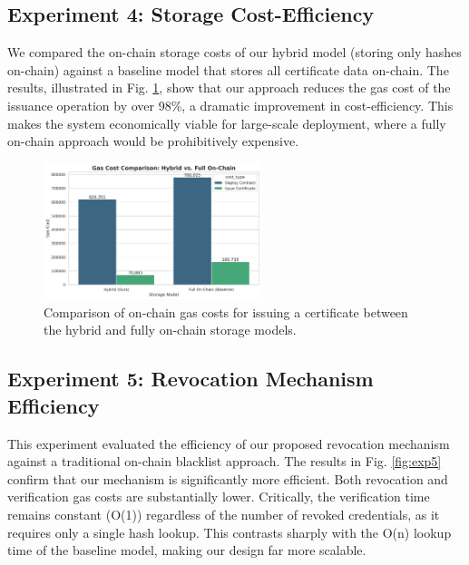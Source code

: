 \documentclass[lettersize,journal]{IEEEtran}
\begin{document}
\begin{itemize}
\subsection{Experiment 4: Storage Cost-Efficiency}
We compared the on-chain storage costs of our hybrid model (storing only hashes on-chain) against a baseline model that stores all certificate data on-chain. The results, illustrated in Fig. \ref{fig:exp4}, show that our approach reduces the gas cost of the issuance operation by over 98\%, a dramatic improvement in cost-efficiency. This makes the system economically viable for large-scale deployment, where a fully on-chain approach would be prohibitively expensive.

\begin{figure}[!t]
\centering
\includegraphics[width=2.5in]{figures/fig4_storage_cost.png}
\caption{Comparison of on-chain gas costs for issuing a certificate between the hybrid and fully on-chain storage models.}
\label{fig:exp4}
\end{figure}

\subsection{Experiment 5: Revocation Mechanism Efficiency}
This experiment evaluated the efficiency of our proposed revocation mechanism against a traditional on-chain blacklist approach. The results in Fig. \ref{fig:exp5} confirm that our mechanism is significantly more efficient. Both revocation and verification gas costs are substantially lower. Critically, the verification time remains constant (O(1)) regardless of the number of revoked credentials, as it requires only a single hash lookup. This contrasts sharply with the O(n) lookup time of the baseline model, making our design far more scalable.


\end{itemize}
\end{document}
